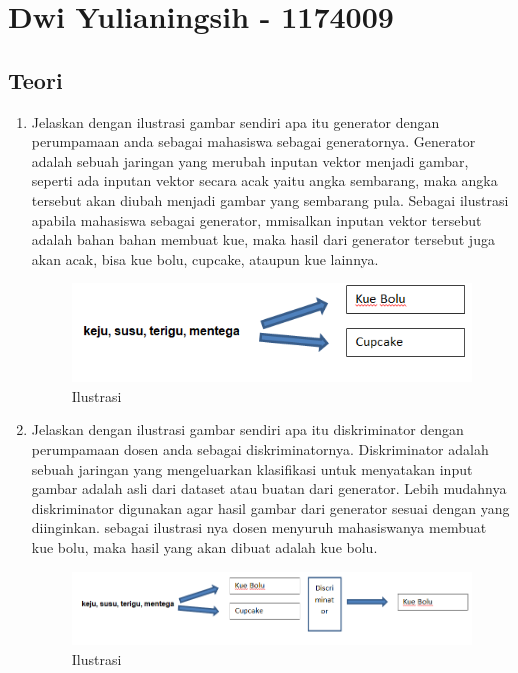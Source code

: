\section{Dwi Yulianingsih - 1174009}
\subsection{Teori}

\begin{enumerate}

\item Jelaskan dengan ilustrasi gambar sendiri apa itu generator dengan perumpamaan anda sebagai mahasiswa sebagai generatornya.
Generator adalah sebuah jaringan yang merubah inputan vektor menjadi gambar, seperti ada inputan vektor secara acak yaitu angka sembarang, maka angka tersebut akan diubah menjadi gambar yang sembarang pula. Sebagai ilustrasi apabila mahasiswa sebagai generator, mmisalkan inputan vektor tersebut adalah bahan bahan membuat kue, maka hasil dari generator tersebut juga akan acak, bisa kue bolu, cupcake, ataupun kue lainnya.
\begin{figure}[H]
\centering
\includegraphics[scale=0.4]{figures/1174009/8/1.PNG}
\caption{Ilustrasi}
\label{Contoh}
\end{figure}


\item Jelaskan dengan ilustrasi gambar sendiri apa itu diskriminator dengan perumpamaan dosen anda sebagai diskriminatornya.
Diskriminator adalah sebuah jaringan yang mengeluarkan klasifikasi untuk menyatakan input gambar adalah asli dari dataset atau buatan dari generator. Lebih mudahnya diskriminator digunakan agar hasil gambar dari generator sesuai dengan yang diinginkan. sebagai ilustrasi nya dosen menyuruh mahasiswanya membuat kue bolu, maka hasil yang akan dibuat adalah kue bolu.
\begin{figure}[H]
\centering
\includegraphics[scale=0.4]{figures/1174009/8/2.PNG}
\caption{Ilustrasi}
\label{Contoh}
\end{figure}



\end{enumerate}
